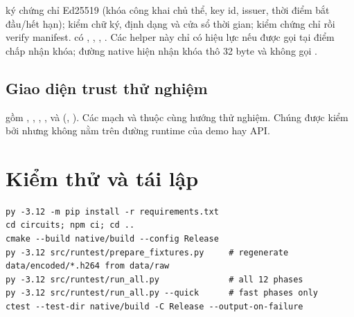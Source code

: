 \documentclass[11pt,a4paper]{article}
\begin{document}
 ký chứng chỉ Ed25519 (khóa công
khai chủ thể, key id, issuer, thời điểm bắt đầu/hết hạn);
 kiểm chữ ký, định dạng và cửa sổ thời gian;
 kiểm chứng chỉ rồi verify manifest.
 có , ,
, . Các helper này chỉ có
hiệu lực nếu được gọi tại điểm chấp nhận khóa; đường native hiện nhận khóa thô 32 byte
và không gọi .

\subsection{Giao diện trust thử nghiệm}

 gồm , ,
, ,  và
 (, ).
Các mạch  và
 thuộc cùng hướng thử nghiệm. Chúng được kiểm
bởi  nhưng không nằm trên đường runtime của demo hay API.

\section{Kiểm thử và tái lập}

\begin{lstlisting}[numbers=none]
py -3.12 -m pip install -r requirements.txt
cd circuits; npm ci; cd ..
cmake --build native/build --config Release
py -3.12 src/runtest/prepare_fixtures.py     # regenerate data/encoded/*.h264 from data/raw
py -3.12 src/runtest/run_all.py              # all 12 phases
py -3.12 src/runtest/run_all.py --quick      # fast phases only
ctest --test-dir native/build -C Release --output-on-failure
\end{lstlisting}
\end{document}

